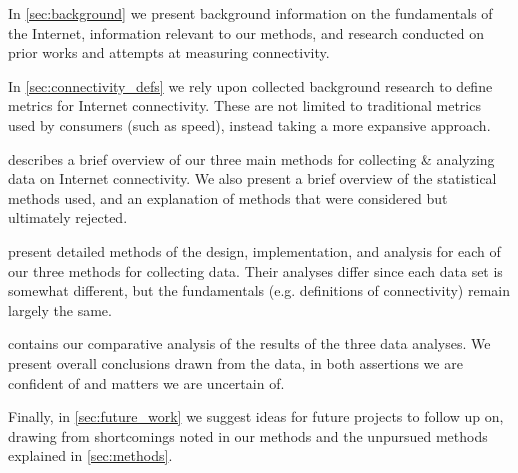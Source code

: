 In \cref{sec:background} we present background information on the fundamentals of the Internet, information relevant to our methods, and research conducted on prior works and attempts at measuring connectivity.

In \cref{sec:connectivity_defs} we rely upon collected background research to define metrics for Internet connectivity. These are not limited to traditional metrics used by consumers (such as speed), instead taking a more expansive approach.

 describes a brief overview of our three main methods for collecting \& analyzing data on Internet connectivity. We also present a brief overview of the statistical methods used, and an explanation of methods that were considered but ultimately rejected.

 present detailed methods of the design, implementation, and analysis for each of our three methods for collecting data. Their analyses differ since each data set is somewhat different, but the fundamentals (e.g. definitions of connectivity) remain largely the same.

 contains our comparative analysis of the results of the three data analyses. We present overall conclusions drawn from the data, in both assertions we are confident of and matters we are uncertain of.

Finally, in \cref{sec:future_work} we suggest ideas for future projects to follow up on, drawing from shortcomings noted in our methods and the unpursued methods explained in \cref{sec:methods}.
